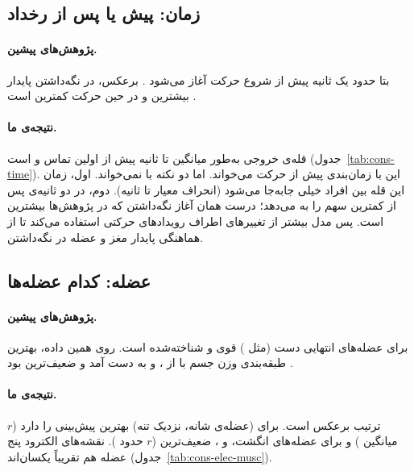 \subsection{زمان: پیش یا پس از رخداد}

\paragraph{پژوهش‌های پیشین.}  بتا حدود یک ثانیه پیش از شروع حرکت آغاز می‌شود \cite{pfurtscheller1999}.  برعکس، در نگه‌داشتن پایدار بیشترین و در حین حرکت کمترین است \cite{kilner2000}.

\paragraph{نتیجه‌ی ما.} قله‌ی  خروجی  به‌طور میانگین  تا  ثانیه پیش از اولین تماس و  است (جدول~\ref{tab:cons-time}). این با زمان‌بندی  پیش از حرکت می‌خواند. اما دو نکته با  نمی‌خواند. اول، زمان این قله بین افراد خیلی جابه‌جا می‌شود (انحراف معیار  تا  ثانیه). دوم،  در دو ثانیه‌ی پس از  کمترین سهم را به  می‌دهد؛ درست همان آغاز نگه‌داشتن که  در پژوهش‌ها بیشترین است. پس مدل بیشتر از تغییرهای اطراف رویدادهای حرکتی استفاده می‌کند تا از هماهنگی پایدار مغز و عضله در نگه‌داشتن.

\subsection{عضله: کدام عضله‌ها}

\paragraph{پژوهش‌های پیشین.}  برای عضله‌های انتهایی دست (مثل ) قوی و شناخته‌شده است. روی همین داده، بهترین طبقه‌بندی وزن جسم با  از ،  و  به دست آمد و  ضعیف‌ترین بود \cite{cisotto2018}.

\paragraph{نتیجه‌ی ما.} ترتیب برعکس است.  برای  (عضله‌ی شانه، نزدیک تنه) بهترین پیش‌بینی را دارد ($r$ میانگین ) و برای عضله‌های انگشت،  و ، ضعیف‌ترین ($r$ حدود ). نقشه‌های الکترود پنج عضله هم تقریباً یکسان‌اند (جدول~\ref{tab:cons-elec-musc}).

